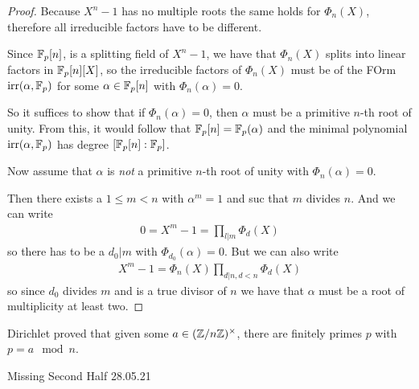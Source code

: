\begin{proof}
  Because $X^{n} -1$ has no multiple roots the same holds for $\Phi_n(X)$, therefore all irreducible factors have to be different.

  Since $\mathbb{F}_p[n]$, is a splitting field of $X^{n}-1$, we have that $\Phi_n(X)$ splits into linear factors in $\mathbb{F}_p[n][X]$, so the irreducible factors of $\Phi_n(X)$ must be of the FOrm $\text{irr}(\alpha,\mathbb{F}_p)$ for some $\alpha \in \mathbb{F}_p[n]$ with $\Phi_n(\alpha) = 0$.

  So it suffices to show that if $\Phi_n(\alpha) = 0$, then $\alpha$ must be a primitive $n$-th root of unity.
  From this, it would follow that $\mathbb{F}_p[n] = \mathbb{F}_p(\alpha)$ and the minimal polynomial $\text{irr}(\alpha,\mathbb{F}_p)$ has degree $[\mathbb{F}_p[n] : \mathbb{F}_p]$.

  Now assume that $\alpha$ is \emph{not} a primitive $n$-th root of unity with $\Phi_n(\alpha) = 0$.

  Then there exists a $1 \leq m <n$ with $\alpha^{m} = 1$ and suc that $m$ divides $n$.
  And we can write
  \begin{align*}
    0 = X^{m} - 1 = \prod_{l | m} \Phi_d(X) 
  \end{align*}
  so there has to be a $d_0 | m$ with $\Phi_{d_0}(\alpha) = 0$.
  But we can also write
  \begin{align*}
    X^{m} -1 = \Phi_n(X) \prod_{d|n, d < n} \Phi_d(X)
  \end{align*}
  so since $d_0$ divides $m$ and is a true divisor of $n$ we have that $\alpha$ must be a root of multiplicity at least two.
\end{proof}


Dirichlet proved that given some $a \in (\mathbb{Z}/n\mathbb{Z})^{\times}$, there are finitely primes $p$ with $p = a \mod n$.


\begin{center}
\Large Missing Second Half 28.05.21
\end{center}
